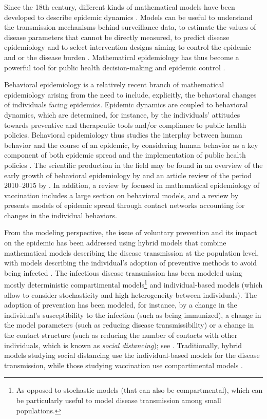 Since the 18th century, different kinds of mathematical models have been developed to describe epidemic dynamics \cite[]{Brauer2017}. Models can be useful to understand the transmission mechanisms behind surveillance data, to estimate the values of disease parameters that cannot be directly measured, to predict disease epidemiology and to select intervention designs aiming to control the epidemic and or the disease burden \cite[]{Valleron2000}. Mathematical epidemiology has thus become a powerful tool for public health decision-making and epidemic control \cite[]{Valleron2000}. 

Behavioral epidemiology is a relatively recent branch of mathematical epidemiology arising from the need to include, explicitly, the behavioral changes of individuals facing epidemics. Epidemic dynamics are coupled to behavioral dynamics, which are determined, for instance, by the individuals' attitudes towards preventive and therapeutic tools and/or compliance to public health policies. Behavioral epidemiology thus studies the interplay between human behavior and the course of an epidemic, by considering human behavior as a key component of both epidemic spread and the implementation of public health policies \cite[]{Bauch2013}. The scientific production in the field may be found in an overview of the early growth of behavioral epidemiology by \cite{Bauch2013} and an article review of the period 2010--2015 by \cite{Verelst2016}. In addition, a review by \cite{Wang2016} focused in mathematical epidemiology of vaccination includes a large section on behavioral models, and a review by \cite{Wang2015} presents models of epidemic spread through contact networks accounting for changes in the individual behaviors.%

From the modeling perspective, the issue of voluntary prevention and its impact on the epidemic has been addressed using hybrid models that combine mathematical models describing the disease transmission at the population level, with models describing the individual's adoption of preventive methods to avoid being infected \cite[]{Verelst2016}. The infectious disease transmission has been modeled using mostly deterministic compartimental models\footnote{As opposed to stochastic models (that can also be compartmental), which can be particularly useful to model disease transmission among small populations.}  and individual-based models (which allow to consider stochasticity and high heterogeneity between individuals). The adoption of prevention has been modeled, for instance, by a change in the individual's susceptibility to the infection (such as being immunized), a change in the model parameters (such as reducing disease transmissibility) or a change in the contact structure (such as reducing the number of contacts with other individuals, which is known as \textit{social distancing}); see \cite{Verelst2016}. Traditionally, hybrid models studying social distancing use the individual-based models for the disease transmission, while those studying vaccination use compartimental models \cite[]{Verelst2016}.

